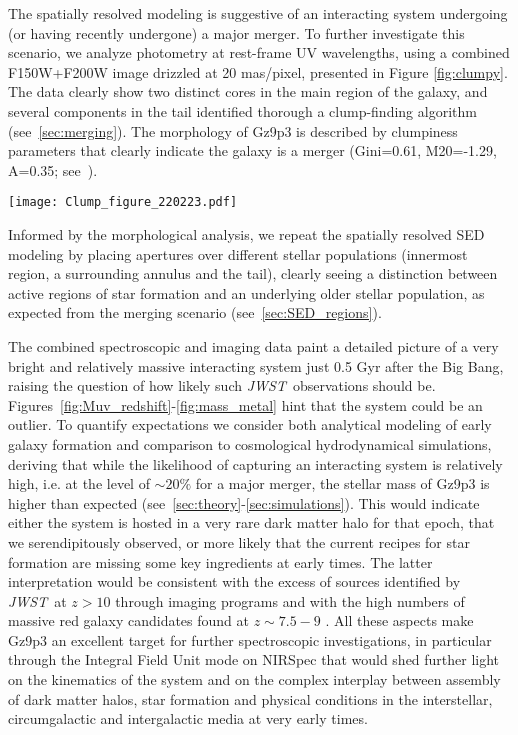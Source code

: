 \documentclass[sn-mathphys]{sn-jnl}%
\theoremstyle{thmstyleone}%
\theoremstyle{thmstyletwo}%
\theoremstyle{thmstylethree}%
\newcommand{\jwst}{\textit{JWST}}
\begin{document}
The spatially resolved modeling is suggestive of an interacting system undergoing (or having recently undergone) a major merger. To further investigate this scenario, we analyze photometry at rest-frame UV wavelengths, using a combined F150W+F200W image drizzled at 20 mas/pixel, presented in Figure \ref{fig:clumpy}.
The data clearly show two distinct cores in the main region of the galaxy, and several components in the tail identified thorough a clump-finding algorithm (see~\ref{sec:merging}). The morphology of Gz9p3 is described by clumpiness parameters that clearly indicate the galaxy is a merger (Gini=0.61, M20=-1.29, A=0.35; see~\cite{Lotz08}). 

\begin{figure*}
    \centering
    \texttt{[image: Clump\_figure\_220223.pdf]}
    \caption{Morphology of Gz9p3, shown in the combined F150W+F200W direct image at a 20mas/px resolution. Left: direct imaging shows a double core within the central region and an elongated clumpy structure. Right: Clump-map, showing 4 clumps detected within the tail of the system with a clumpiness parameter $c=0.56$.}
    \label{fig:clumpy}
\end{figure*}

Informed by the morphological analysis, we repeat the spatially resolved SED modeling by placing apertures over different stellar populations (innermost region, a surrounding annulus and the tail), clearly seeing a distinction between active regions of star formation and an underlying older stellar population, as expected from the merging scenario (see~\ref{sec:SED_regions}). 

The combined spectroscopic and imaging data paint a detailed picture of a very bright and relatively massive interacting system just 0.5 Gyr after the Big Bang, raising the question of how likely such \jwst\ observations should be. Figures~\ref{fig:Muv_redshift}-\ref{fig:mass_metal} hint that the system could be an outlier. To quantify expectations we consider both analytical modeling of early galaxy formation and comparison to cosmological hydrodynamical simulations, deriving that while the likelihood of capturing an interacting system is relatively high, i.e. at the level of $\sim 20\%$ for a major merger, the stellar mass of Gz9p3 is higher than expected (see~\ref{sec:theory}-\ref{sec:simulations}). This would indicate either the system is hosted in a very rare dark matter halo for that epoch, that we serendipitously observed, or more likely that the current recipes for star formation are missing some key ingredients at early times. The latter interpretation would be consistent with the excess of sources identified by \jwst\ at $z>10$ through imaging programs \cite{Castellano22b} and with the high numbers of massive red galaxy candidates found at $z\sim 7.5-9$ \cite{Labbe22}. All these aspects make Gz9p3 an excellent target for further spectroscopic investigations, in particular through the Integral Field Unit mode on NIRSpec that would shed further light on the kinematics of the system and on the complex interplay between assembly of dark matter halos, star formation and physical conditions in the interstellar, circumgalactic and intergalactic media at very early times.  
\end{document}
